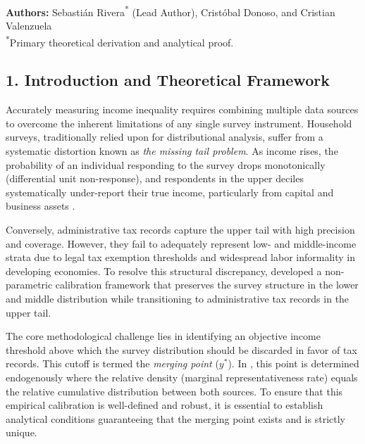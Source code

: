 \begin{center}
    \small
    \textbf{Authors:} Sebastián Rivera\textsuperscript{*} (Lead Author), Cristóbal Donoso, and Cristian Valenzuela \\
    \vspace{0.1em}
    \footnotesize{\textsuperscript{*}Primary theoretical derivation and analytical proof.}
\end{center}
\vspace{0.8em}

\subsection*{1. Introduction and Theoretical Framework}

Accurately measuring income inequality requires combining multiple data sources to overcome the inherent limitations of any single survey instrument. Household surveys, traditionally relied upon for distributional analysis, suffer from a systematic distortion known as \textit{the missing tail problem}. As income rises, the probability of an individual responding to the survey drops monotonically (differential unit non-response), and respondents in the upper deciles systematically under-report their true income, particularly from capital and business assets \citep{deaton2005measuring}.

Conversely, administrative tax records capture the upper tail with high precision and coverage. However, they fail to adequately represent low- and middle-income strata due to legal tax exemption thresholds and widespread labor informality in developing economies. To resolve this structural discrepancy, \citet{blanchet2022weight} developed a non-parametric calibration framework that preserves the survey structure in the lower and middle distribution while transitioning to administrative tax records in the upper tail.

The core methodological challenge lies in identifying an objective income threshold above which the survey distribution should be discarded in favor of tax records. This cutoff is termed the \textit{merging point} ($y^*$). In \citet{blanchet2022weight}, this point is determined endogenously where the relative density (marginal representativeness rate) equals the relative cumulative distribution between both sources. To ensure that this empirical calibration is well-defined and robust, it is essential to establish analytical conditions guaranteeing that the merging point exists and is strictly unique.

